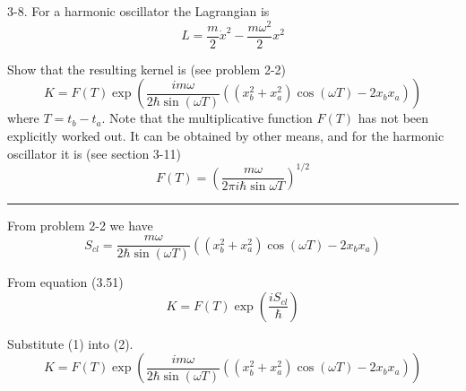 \documentclass[12pt]{article}
\begin{document}
3-8.
For a harmonic oscillator the Lagrangian is
\begin{equation*}
L=\frac{m}{2}\dot x^2-\frac{m\omega^2}{2}x^2
\tag{3.58}
\end{equation*}

Show that the resulting kernel is (see problem 2-2)
\begin{equation*}
K=F(T)\exp\left(
\frac{im\omega}{2\hbar\sin(\omega T)}
\left((x_b^2+x_a^2)\cos(\omega T)-2x_b x_a\right)
\right)
\tag{3.59}
\end{equation*}
where $T=t_b-t_a$.
Note that the multiplicative function $F(T)$ has not been explicitly
worked out.
It can be obtained by other means, and for the harmonic oscillator
it is (see section 3-11)
\begin{equation*}
F(T)=\left(\frac{m\omega}{2\pi i\hbar\sin\omega T}\right)^{1/2}
\tag{3.60}
\end{equation*}

\bigskip
\hrule

\bigskip
From problem 2-2 we have
\begin{equation*}
S_{cl}=\frac{m\omega}{2\hbar\sin(\omega T)}
\left((x_b^2+x_a^2)\cos(\omega T)-2x_b x_a\right)
\tag{1}
\end{equation*}

From equation (3.51)
\begin{equation*}
K=F(T)\exp\left(
\frac{iS_{cl}}{\hbar}
\right)
\tag{2}
\end{equation*}

Substitute (1) into (2).
\begin{equation*}
K=F(T)\exp\left(
\frac{im\omega}{2\hbar\sin(\omega T)}
\left((x_b^2+x_a^2)\cos(\omega T)-2x_b x_a\right)
\right)
\end{equation*}
\end{document}
